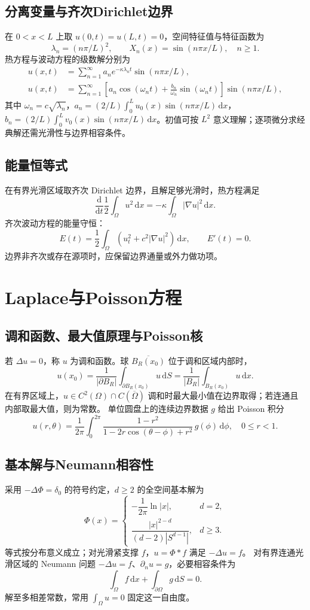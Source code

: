 \documentclass[../main.tex]{subfiles}
\begin{document}
\subsection{分离变量与齐次Dirichlet边界}
在 $0<x<L$ 上取 $u(0,t)=u(L,t)=0$，空间特征值与特征函数为
\[
\lambda_n=(n\pi/L)^2,\qquad X_n(x)=\sin(n\pi x/L),\quad n\ge1.
\]
热方程与波动方程的级数解分别为
\begin{align*}
u(x,t)&=\sum_{n=1}^\infty a_ne^{-\kappa\lambda_nt}\sin(n\pi x/L),\\
u(x,t)&=\sum_{n=1}^\infty\left[a_n\cos(\omega_nt)+\frac{b_n}{\omega_n}\sin(\omega_nt)\right]\sin(n\pi x/L),
\end{align*}
其中 $\omega_n=c\sqrt{\lambda_n}$，$a_n=(2/L)\int_0^Lu_0(x)\sin(n\pi x/L)\,\mathrm dx$，$b_n=(2/L)\int_0^Lv_0(x)\sin(n\pi x/L)\,\mathrm dx$。初值可按 $L^2$ 意义理解；逐项微分求经典解还需光滑性与边界相容条件。
\subsection{能量恒等式}
在有界光滑区域取齐次 Dirichlet 边界，且解足够光滑时，热方程满足
\[
\frac{\mathrm d}{\mathrm dt}\frac12\int_\Omega u^2\,\mathrm dx
=-\kappa\int_\Omega|\nabla u|^2\,\mathrm dx.
\]
齐次波动方程的能量守恒：
\[
E(t)=\frac12\int_\Omega(u_t^2+c^2|\nabla u|^2)\,\mathrm dx,\qquad E'(t)=0.
\]
边界非齐次或存在源项时，应保留边界通量或外力做功项。
\section{Laplace与Poisson方程}
\subsection{调和函数、最大值原理与Poisson核}
若 $\Delta u=0$，称 $u$ 为调和函数。球 $\overline{B_R(x_0)}$ 位于调和区域内部时，
\[
u(x_0)=\frac1{|\partial B_R|}\int_{\partial B_R(x_0)}u\,\mathrm dS
=\frac1{|B_R|}\int_{B_R(x_0)}u\,\mathrm dx.
\]
在有界区域上，$u\in C^2(\Omega)\cap C(\overline\Omega)$ 调和时最大最小值在边界取得；若连通且内部取最大值，则为常数。
单位圆盘上的连续边界数据 $g$ 给出 Poisson 积分
\[
u(r,\theta)=\frac1{2\pi}\int_0^{2\pi}
\frac{1-r^2}{1-2r\cos(\theta-\phi)+r^2}\,g(\phi)\,\mathrm d\phi,
\quad0\le r<1.
\]
\subsection{基本解与Neumann相容性}
采用 $-\Delta\Phi=\delta_0$ 的符号约定，$d\ge2$ 的全空间基本解为
\[
\Phi(x)=\begin{cases}
-\dfrac1{2\pi}\ln|x|,&d=2,\\
\dfrac{|x|^{2-d}}{(d-2)|S^{d-1}|},&d\ge3.
\end{cases}
\]
等式按分布意义成立；对光滑紧支撑 $f$，$u=\Phi*f$ 满足 $-\Delta u=f$。
对有界连通光滑区域的 Neumann 问题 $-\Delta u=f$、$\partial_nu=g$，必要相容条件为
\[
\int_\Omega f\,\mathrm dx+\int_{\partial\Omega}g\,\mathrm dS=0.
\]
解至多相差常数，常用 $\int_\Omega u=0$ 固定这一自由度。
\end{document}
